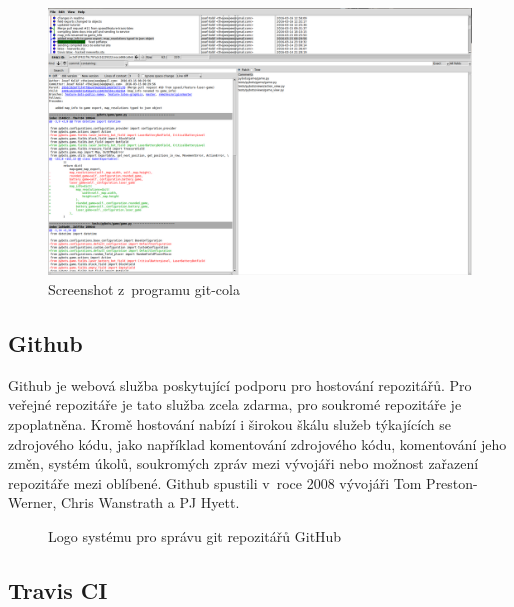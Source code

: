 \begin{figure}[bht]
	\centering
	\begin{minipage}{\textwidth}
 		\centering
 		\includegraphics[width=\textwidth]{assets/git-cola-screenshot}
 		\caption{Screenshot z~programu git-cola}
 		\label{fig:git-cola}
 	\end{minipage}
\end{figure}

\subsection{Github}

Github je webová služba poskytující podporu pro hostování  repozitářů. Pro veřejné repozitáře je tato služba zcela zdarma, pro soukromé repozitáře je zpoplatněna. Kromě hostování nabízí i širokou škálu služeb týkajících se zdrojového kódu, jako například komentování zdrojového k\'{o}du, komentování jeho změn, systém úkolů, soukromých zpráv mezi vývojáři nebo možnost zařazení repozitáře mezi oblíbené. Github spustili v~roce 2008 vývojáři Tom Preston-Werner, Chris Wanstrath a PJ Hyett.

\begin{figure}[bht]
 	\centering
 	
 	\caption{Logo systému pro správu git repozitářů GitHub}
\end{figure}

\subsection{Travis CI}

